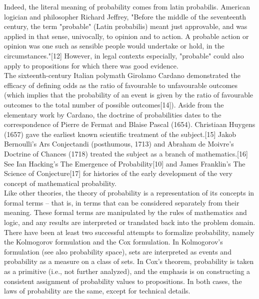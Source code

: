 \documentclass{book}
\begin{document}
Indeed, the literal meaning of probability comes from latin probabilis. American logician and philosopher Richard Jeffrey, "Before the middle of the seventeenth century, the term "probable" (Latin probabilis) meant just approvable, and was applied in that sense, univocally, to opinion and to action. A probable action or opinion was one such as sensible people would undertake or hold, in the circumstances."[12] However, in legal contexts especially, "probable" could also apply to propositions for which there was good evidence.\\

The sixteenth-century Italian polymath Girolamo Cardano demonstrated the efficacy of defining odds as the ratio of favourable to unfavourable outcomes (which implies that the probability of an event is given by the ratio of favourable outcomes to the total number of possible outcomes[14]). Aside from the elementary work by Cardano, the doctrine of probabilities dates to the correspondence of Pierre de Fermat and Blaise Pascal (1654). Christiaan Huygens (1657) gave the earliest known scientific treatment of the subject.[15] Jakob Bernoulli's Ars Conjectandi (posthumous, 1713) and Abraham de Moivre's Doctrine of Chances (1718) treated the subject as a branch of mathematics.[16] See Ian Hacking's The Emergence of Probability[10] and James Franklin's The Science of Conjecture[17] for histories of the early development of the very concept of mathematical probability.\\

Like other theories, the theory of probability is a representation of its concepts in formal terms – that is, in terms that can be considered separately from their meaning. These formal terms are manipulated by the rules of mathematics and logic, and any results are interpreted or translated back into the problem domain.\\

There have been at least two successful attempts to formalize probability, namely the Kolmogorov formulation and the Cox formulation. In Kolmogorov's formulation (see also probability space), sets are interpreted as events and probability as a measure on a class of sets. In Cox's theorem, probability is taken as a primitive (i.e., not further analyzed), and the emphasis is on constructing a consistent assignment of probability values to propositions. In both cases, the laws of probability are the same, except for technical details.\\
\end{document}
